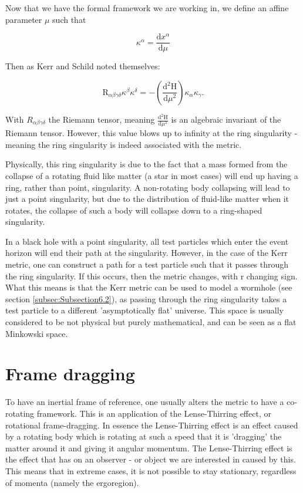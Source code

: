 \documentclass[oneside,openright,frontopenright, singlespacing]{dmathesis}
\begin{document}
\vspace{1em}
	Now that we have the formal framework we are working in, we define an affine parameter $\mu$ such that

	\[\kappa^\alpha=\frac{\mbox{d}x^\alpha}{\mbox{d}\mu}\]

\vspace{1em}
	Then as Kerr and Schild noted themselves:

	\[\mbox{R}_{\alpha\beta\gamma\delta}\kappa^\beta\kappa^\delta = -\left(\frac{\mbox{d}^2\mbox{H}}{\mbox{d}\mu^2}\right)\kappa_\alpha\kappa_\gamma.\]

\vspace{1em}
	With $R_{\alpha\beta\gamma\delta}$ the Riemann tensor, meaning $\frac{\mbox{d}^2\mbox{H}}{\mbox{d}\mu^2}$ is an algebraic invariant of the Riemann tensor. However, this value blows up to infinity at the ring singularity - meaning the ring singularity is indeed associated with the metric.

\vspace{1em}
	Physically, this ring singularity is due to the fact that a mass formed from the collapse of a rotating fluid like matter (a star in most cases) will end up having a ring, rather than point, singularity. A non-rotating body collapsing will lead to just a point singularity, but due to the distribution of fluid-like matter when it rotates, the collapse of such a body will collapse down to a ring-shaped singularity.

\vspace{1em}
	In a black hole with a point singularity, all test particles which enter the event horizon will end their path at the singularity. However, in the case of the Kerr metric, one can construct a path for a test particle such that it passes through the ring singularity. If this occurs, then the metric changes, with r changing sign. What this means is that the Kerr metric can be used to model a wormhole (see section \ref{subsec:Subsection6.2}), as passing through the ring singularity takes a test particle to a different 'asymptotically flat' universe. This space is usually considered to be not physical but purely mathematical, and can be seen as a flat Minkowski space.

\section{Frame dragging}\label{sec:Section4.4}

	To have an inertial frame of reference, one usually alters the metric to have a co-rotating framework. This is an application of the Lense-Thirring effect, or rotational frame-dragging. In essence the Lense-Thirring effect is an effect caused by a rotating body which is rotating at such a speed that it is 'dragging' the matter around it and giving it angular momentum. The Lense-Thirring effect is the effect that has on an observer - or object we are interested in caused by this. This means that in extreme cases, it is not possible to stay stationary, regardless of momenta (namely the ergoregion).
\end{document}
